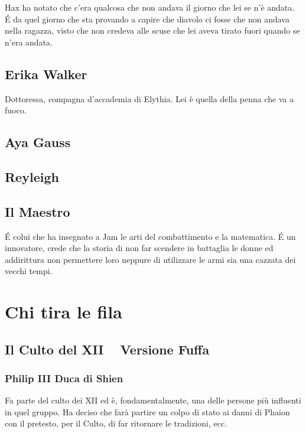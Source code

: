 \documentclass[9pt,a4paper,cleardoubleempty]{scrbook}
\begin{document}
      Hax ha notato che c'era qualcosa che non andava il giorno che lei se
      n'è andata. \'E da quel giorno che sta provando a capire che diavolo
      ci fosse che non andava nella ragazza, visto che non credeva alle
      scuse che lei aveva tirato fuori quando se n'era andata.

    \section{Erika Walker}
      Dottoressa, compagna d'accademia di Elythia. Lei è quella della penna
      che va a fuoco.

    \section{Aya Gauss}

    \section{Reyleigh}

    \section{Il Maestro}
      \'E colui che ha insegnato a Jam le arti del combattimento e la
      matematica. \'E un innovatore, crede che la storia di non far
      scendere in battaglia le donne ed addirittura non permettere loro
      neppure di utilizzare le armi sia una cazzata dei vecchi tempi.

    \chapter{Chi tira le fila}
      
      \section{Il Culto del XII ~ Versione Fuffa}
        
        \subsection{Philip III Duca di Shien}
          Fa parte del culto dei XII ed è, fondamentalmente, una delle
          persone più influenti in quel gruppo. Ha deciso che farà partire
          un colpo di stato ai danni di Phaion con il pretesto, per il
          Culto, di far ritornare le tradizioni, ecc.
\end{document}
